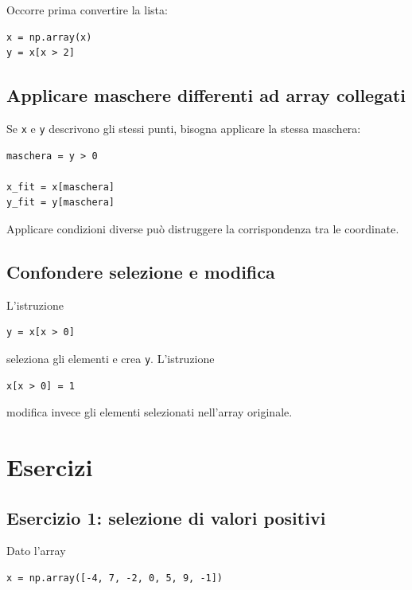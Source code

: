 \documentclass[11pt,a4paper]{book}
\begin{document}
Occorre prima convertire la lista:

\begin{lstlisting}
x = np.array(x)
y = x[x > 2]
\end{lstlisting}

\subsection{Applicare maschere differenti ad array collegati}

Se \texttt{x} e \texttt{y} descrivono gli stessi punti, bisogna applicare la stessa maschera:

\begin{lstlisting}
maschera = y > 0

x_fit = x[maschera]
y_fit = y[maschera]
\end{lstlisting}

Applicare condizioni diverse può distruggere la corrispondenza tra le coordinate.

\subsection{Confondere selezione e modifica}

L'istruzione

\begin{lstlisting}
y = x[x > 0]
\end{lstlisting}

seleziona gli elementi e crea \texttt{y}. L'istruzione

\begin{lstlisting}
x[x > 0] = 1
\end{lstlisting}

modifica invece gli elementi selezionati nell'array originale.

\section{Esercizi}

\subsection*{Esercizio 1: selezione di valori positivi}

Dato l'array

\begin{lstlisting}
x = np.array([-4, 7, -2, 0, 5, 9, -1])
\end{lstlisting}
\end{document}
